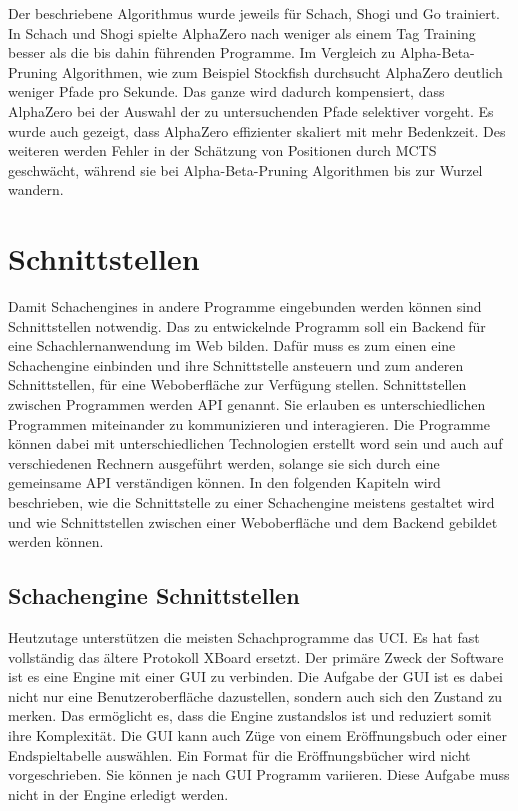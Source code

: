 Der beschriebene Algorithmus wurde jeweils für Schach, Shogi und Go trainiert. In Schach und Shogi spielte AlphaZero nach weniger als einem Tag Training besser als die bis dahin führenden Programme. Im Vergleich zu Alpha-Beta-Pruning Algorithmen, wie zum Beispiel Stockfish durchsucht AlphaZero deutlich weniger Pfade pro Sekunde. Das ganze wird dadurch kompensiert, dass AlphaZero bei der Auswahl der zu untersuchenden Pfade selektiver vorgeht. Es wurde auch gezeigt, dass AlphaZero effizienter skaliert mit mehr Bedenkzeit. Des weiteren werden Fehler in der Schätzung von Positionen durch \ac{MCTS} geschwächt, während sie bei Alpha-Beta-Pruning Algorithmen bis zur Wurzel wandern.
\cite{silver_mastering_2017}

\section{Schnittstellen}
Damit Schachengines in andere Programme eingebunden werden können sind Schnittstellen notwendig.
Das zu entwickelnde Programm soll ein Backend für eine Schachlernanwendung im Web bilden. Dafür muss es zum einen eine Schachengine einbinden und ihre Schnittstelle ansteuern und zum anderen Schnittstellen, für eine Weboberfläche zur Verfügung stellen.
Schnittstellen zwischen Programmen werden \ac{API} genannt. Sie erlauben es unterschiedlichen Programmen miteinander zu kommunizieren und interagieren. Die Programme können dabei mit unterschiedlichen Technologien erstellt word sein und auch auf verschiedenen Rechnern ausgeführt werden, solange sie sich durch eine gemeinsame \ac{API} verständigen können.
In den folgenden Kapiteln wird beschrieben, wie die Schnittstelle zu einer Schachengine meistens gestaltet wird und wie Schnittstellen zwischen einer Weboberfläche und dem Backend gebildet werden können.

\subsection{Schachengine Schnittstellen}
Heutzutage unterstützen die meisten Schachprogramme das \ac{UCI}. Es hat fast vollständig das ältere Protokoll XBoard ersetzt. Der primäre Zweck der Software ist es eine Engine mit einer GUI zu verbinden. Die Aufgabe der GUI ist es dabei nicht nur eine Benutzeroberfläche dazustellen, sondern auch sich den Zustand zu merken. Das ermöglicht es, dass die Engine zustandslos ist und reduziert somit ihre Komplexität. Die GUI kann auch Züge von einem Eröffnungsbuch oder einer Endspieltabelle auswählen. Ein Format für die Eröffnungsbücher wird nicht vorgeschrieben. Sie können je nach GUI Programm variieren. Diese Aufgabe muss nicht in der Engine erledigt werden.
\cite{wikpedia_foundation_inc_universal_2024}

